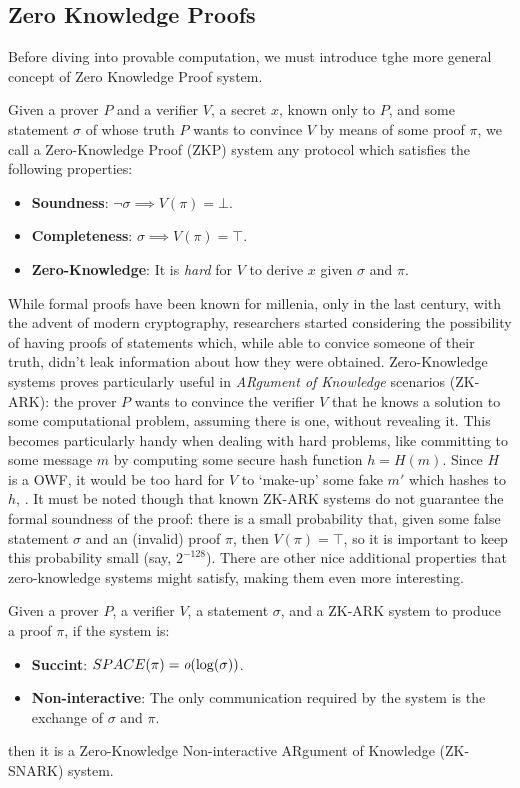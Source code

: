 \subsection{Zero Knowledge Proofs}
Before diving into provable computation, we must introduce tghe more general concept of Zero
Knowledge Proof system.
\begin{definition}
	Given a prover \(P\) and a verifier \(V\), a secret \(x\), known only to \(P\), and some
	statement \(\sigma \) of whose truth \(P\) wants to convince \(V\) by means of
	some proof \(\pi \), we call a Zero-Knowledge Proof (ZKP) system any protocol which satisfies
	the following properties:
	\begin{itemize}
		\item \textbf{Soundness}: \(\neg{\sigma} \implies V(\pi) = \bot \).
		\item \textbf{Completeness}: \(\sigma \implies V(\pi) = \top \).
		\item \textbf{Zero-Knowledge}: It is \emph{hard} for \(V\) to derive \(x\) given \(\sigma \)
		      and \(\pi \).
	\end{itemize}
\end{definition}

\noindent While formal proofs have been known for millenia, only in the last century, with the
advent of modern cryptography, researchers started considering the possibility of having proofs
of statements which, while able to convice someone of their truth, didn't leak information
about how they were obtained.
Zero-Knowledge systems proves particularly useful in \emph{ARgument of Knowledge} scenarios
(ZK-ARK): the prover \(P\) wants to convince the verifier \(V\) that he
knows a solution to some computational problem, assuming there is one, without revealing it.
This becomes particularly handy when dealing with hard problems, like committing to some message
\(m\) by computing some secure hash function \(h = H(m)\).
Since \(H\) is a OWF, it would be too hard for \(V\) to `make-up' some fake \(m'\) which hashes 
to \(h\), .
It must be noted though that known ZK-ARK systems do not guarantee the formal soundness of
the proof: there is a small probability that, given some false statement \(\sigma \) and an
(invalid) proof \(\pi \), then \(V(\pi) = \top \), so it is important to keep this probability
small (say, \(2^{-128}\)).
There are other nice additional properties that zero-knowledge systems might satisfy, making
them even more interesting.
\begin{definition}[ZK-SNARK]
	Given a prover \(P\), a verifier \(V\), a statement \(\sigma \), and a ZK-ARK system to produce
	a proof \(\pi \), if the system is:
	\begin{itemize}
		\item \textbf{Succint}: \(SPACE(\pi) = \textit{o}(\log(\sigma))\).
		\item \textbf{Non-interactive}: The only communication required by the system is the exchange
		      of \(\sigma \) and \(\pi \).
	\end{itemize}
	then it is a Zero-Knowledge Non-interactive ARgument of Knowledge (ZK-SNARK) system.
\end{definition}


